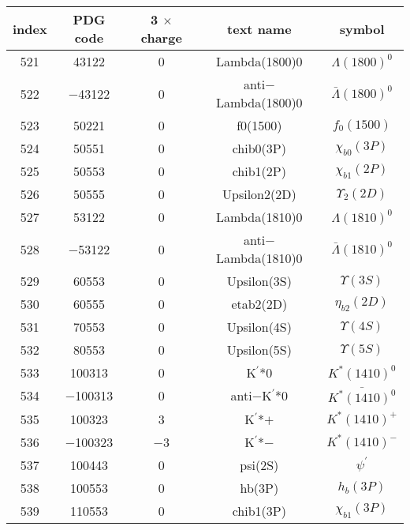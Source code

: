 \documentclass{article}
\begin{document}
\begin{table}[!htbp]
\centering
\begin{tabular}{|c|c|c|c|c|}
\hline
index & PDG code & 3 $\times$ charge & text name & symbol \\
\hline
521 & 43122 & 0 & Lambda(1800)0 & $\Lambda(1800)^{0}$ \\
\hline
522 & $-$43122 & 0 & anti$-$Lambda(1800)0 & $\bar{\Lambda}(1800)^{0}$ \\
\hline
523 & 50221 & 0 & f\underline{\hspace{0.6em}}0(1500) & $f_{0}(1500)$ \\
\hline
524 & 50551 & 0 & chi\underline{\hspace{0.6em}}b0(3P) & $\chi_{b0}(3P)$ \\
\hline
525 & 50553 & 0 & chi\underline{\hspace{0.6em}}b1(2P) & $\chi_{b1}(2P)$ \\
\hline
526 & 50555 & 0 & Upsilon\underline{\hspace{0.6em}}2(2D) & $\Upsilon_{2}(2D)$ \\
\hline
527 & 53122 & 0 & Lambda(1810)0 & $\Lambda(1810)^{0}$ \\
\hline
528 & $-$53122 & 0 & anti$-$Lambda(1810)0 & $\bar{\Lambda}(1810)^{0}$ \\
\hline
529 & 60553 & 0 & Upsilon(3S) & $\Upsilon(3S)$ \\
\hline
530 & 60555 & 0 & eta\underline{\hspace{0.6em}}b2(2D) & $\eta_{b2}(2D)$ \\
\hline
531 & 70553 & 0 & Upsilon(4S) & $\Upsilon(4S)$ \\
\hline
532 & 80553 & 0 & Upsilon(5S) & $\Upsilon(5S)$ \\
\hline
533 & 100313 & 0 & K$^{\prime}$*0 & $K^{*}(1410)^{0}$ \\
\hline
534 & $-$100313 & 0 & anti$-$K$^{\prime}$*0 & $\bar{K^{*}(1410)^{0}}$ \\
\hline
535 & 100323 & 3 & K$^{\prime}$*$+$ & $K^{*}(1410)^{+}$ \\
\hline
536 & $-$100323 & $-$3 & K$^{\prime}$*$-$ & $K^{*}(1410)^{-}$ \\
\hline
537 & 100443 & 0 & psi(2S) & $\psi^{\prime}$ \\
\hline
538 & 100553 & 0 & h\underline{\hspace{0.6em}}b(3P) & $h_b(3P)$ \\
\hline
539 & 110553 & 0 & chi\underline{\hspace{0.6em}}b1(3P) & $\chi_{b1}(3P)$ \\

\end{tabular}
\end{table}
\end{document}
